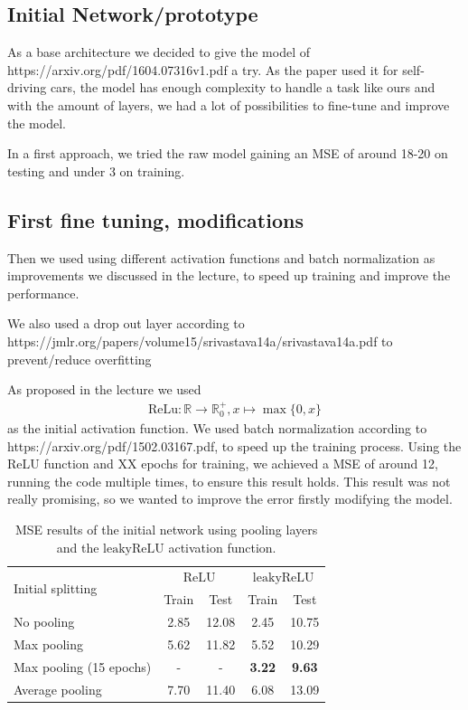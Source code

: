 \documentclass[conference]{IEEEtran}
\begin{document}
\subsection{Initial Network/prototype}

As a base architecture we decided to give the model of https://arxiv.org/pdf/1604.07316v1.pdf a try. As the paper used it
for self-driving cars, the model has enough complexity to handle a task like ours and with the amount of layers, we had a lot of
possibilities to fine-tune and improve the model.

In a first approach, we tried the raw model gaining an MSE of around 18-20 on testing and under 3 on training.

\subsection{First fine tuning, modifications}

Then we used using different activation functions and batch 
normalization as improvements we discussed in the lecture, to speed up training and improve the performance.

We also used a drop out layer according to https://jmlr.org/papers/volume15/srivastava14a/srivastava14a.pdf to prevent/reduce 
overfitting

As proposed in the lecture
we used
\begin{align*}
\mathrm{ReLu}: \mathbb{R} \to \mathbb{R}_0^+, x \mapsto \max\{0,x\}
\end{align*}
as the initial activation function. We used batch normalization according to https://arxiv.org/pdf/1502.03167.pdf, to speed up the 
training process. Using the ReLU function and XX epochs for training, we achieved a MSE of around 12, running the code multiple times, to ensure this result holds. This result was not really promising, so we wanted to improve the error firstly modifying the model.

\begin{table}[!t]
\normalsize
\renewcommand{\arraystretch}{1.3}
\centering
\begin{tabular}{lcccc}
\toprule
\multirow{2}{*}{Initial splitting}  & \multicolumn{2}{c}{$\mathrm{ReLU}$} & \multicolumn{2}{c}{$\mathrm{leakyReLU}$} \\
 & Train & Test & Train & Test\\
\midrule
No pooling & 2.85 & 12.08 & 2.45 & 10.75 \\
Max pooling & 5.62 & 11.82 & 5.52 & 10.29 \\
Max pooling (15 epochs) & - & - & \textbf{3.22} & \textbf{9.63} \\
Average pooling & 7.70 & 11.40 & 6.08 & 13.09\\
\bottomrule
\end{tabular}
\caption{MSE results of the initial network using pooling layers and the $\mathrm{leakyReLU}$ activation function.}
\end{table}
\end{document}
